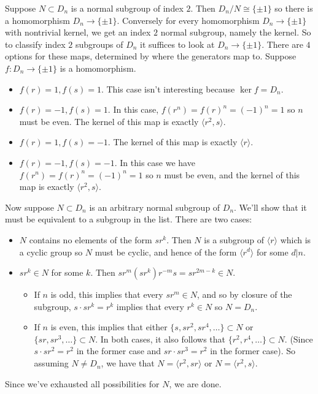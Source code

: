 \documentclass[11pt,letterpaper]{article}
\begin{document}
Suppose $N\subset D_n$ is a normal subgroup of index $2$. Then $D_n /N\cong \{\pm 1\}$ so there is a homomorphism $D_n \to \{\pm 1\}$. Conversely for every homomorphism $D_n \to \{\pm 1\}$ with nontrivial kernel, we get an index $2$ normal subgroup, namely the kernel. So to classify index $2$ subgroups of $D_n$ it suffices to look at $D_n \to \{\pm 1\}$. There are $4$ options for these maps, determined by where the generators map to. Suppose $f : D_n \to \{\pm 1\}$ is a homomorphism.
\begin{itemize}
  \item {\bf{}} $f(r)=1, f(s)=1$. This case isn't interesting because $\ker f=D_n$.
  \item {\bf{}} $f(r)=-1, f(s)=1$. In this case, $f(r^n)=f(r)^n=(-1)^n=1$ so $n$ must be even. The kernel of this map is exactly $\big\langle r^2, s \big\rangle$.
  \item {\bf{}} $f(r)=1, f(s)=-1$. The kernel of this map is exactly $\big\langle r \big\rangle$.
  \item {\bf{}} $f(r)=-1, f(s)=-1$. In this case we have $f(r^n)=f(r)^n=(-1)^n=1$ so $n$ must be even, and the kernel of this map is exactly $\big\langle r^2, s \big\rangle$.        
\end{itemize} 
Now suppose $N\subset D_n$ is an arbitrary normal subgroup of $D_n$. We'll show that it must be equivalent to a subgroup in the list. There are two cases:
\begin{itemize}
  \item {\bf{}} $N$ contains no elements of the form $sr^k$. Then $N$ is a subgroup of $\big\langle r \big\rangle$ which is a cyclic group so $N$ must be cyclic, and hence of the form $\big\langle r^d \big\rangle$ for some $d|n$.  
  \item {\bf{}} $sr^k \in N$ for some $k$. Then $sr^m(sr^k)r^{-m}s=sr^{2m-k}\in N$. 
  \begin{itemize}
    \item {\bf{}} If $n$ is odd, this implies that every $sr^m\in N$, and so by closure of the subgroup, $s\cdot sr^k=r^k$ implies that every $r^k\in N$ so $N=D_n$. 
    \item {\bf{}} If $n$ is even, this implies that either $\{s,sr^2,sr^4,\ldots\}\subset N$ or $\{sr,sr^3,\ldots\}\subset N$. In both cases, it also follows that $\{r^2,r^4,\ldots\}\subset N$. (Since $s\cdot sr^2=r^2$ in the former case and $sr\cdot sr^3=r^2$ in the former case). So assuming $N\neq D_n$, we have that $N=\big\langle r^2, sr\big\rangle$ or $N =\big\langle r^2, s \big\rangle$.    
  \end{itemize} 
\end{itemize}  
Since we've exhausted all possibilities for $N$, we are done.
\end{document}
